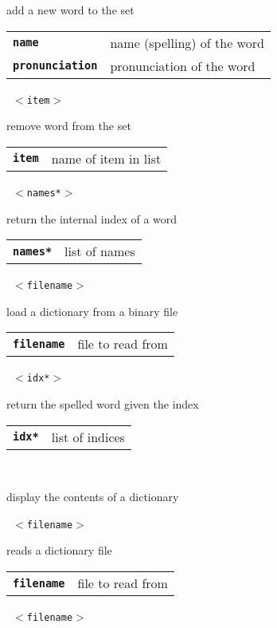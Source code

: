 \begin{description}
\begin{description}
        add a new word to the set

      \begin{tabular}{ll}
 \texttt{\textbf{name}} &           name (spelling) of the word  \\
 \texttt{\textbf{pronunciation}} &  pronunciation of the word \\
      \end{tabular}
       \texttt{ $<$item$>$} \

        remove word from the set

      \begin{tabular}{ll}
 \texttt{\textbf{item}} &  name of item in list  \\
      \end{tabular}
       \texttt{ $<$names*$>$} \

        return the internal index of a word

      \begin{tabular}{ll}
 \texttt{\textbf{names*}} & list of names \\
      \end{tabular}
       \texttt{ $<$filename$>$} \

        load a dictionary from a binary file

      \begin{tabular}{ll}
 \texttt{\textbf{filename}} &  file to read from  \\
      \end{tabular}
       \texttt{ $<$idx*$>$} \

        return the spelled word given the index

      \begin{tabular}{ll}
 \texttt{\textbf{idx*}} & list of indices \\
      \end{tabular}
       \texttt{} \

        display the contents of a dictionary

       \texttt{ $<$filename$>$} \

        reads a dictionary file

      \begin{tabular}{ll}
 \texttt{\textbf{filename}} &  file to read from  \\
      \end{tabular}
       \texttt{ $<$filename$>$} \


\end{description}
\end{description}
